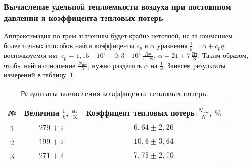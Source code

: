 \documentclass[a4paper,11pt]{article}
\begin{document}
\subsubsection{Вычисление удельной теплоемкости воздуха при постоянном давлении и коэффицента тепловых потерь}
Аппроксимация по трем значениям будет крайне неточной, но за неимением более точных способов найти коэффиценты $c_{p}$ и $\alpha$ уравнения $\frac{1}{k} = \alpha + c_{p}q$, воспользуемся им.\newline
$c_{p} = 1,15\ \cdot\ 10^{4} \pm 0,3\ \cdot\ 10^{4}\ \frac{Дж}{г\ \cdot\ К}$.\newline\newline
$\alpha = 21 \pm 7\ \frac{Вт}{К}$.\newline\newline
Таким образом, чтобы найти отношение $\frac{N_{пот}}{N}$, нужно разделить $\alpha$ на $\frac{1}{k}$. Занесем результаты измерений в таблицу~\ref{table:tab8}.
\begin{table}[h!]
\centering
\begin{tabular}{ ||c|c|c|| }
  \hline
  № & Величина $\frac{1}{k}$, $\frac{Вт}{К}$ & Коэффицент тепловых потерь $\frac{N_{пот}}{N}$, $\%$ \\
  \hline
  1 & $279 \pm 2$ & $6,64 \pm 2,26$ \\
  2 & $199 \pm 2$ & $10,6 \pm 3,64$ \\
  3 & $271 \pm 4$ & $7,75 \pm 2,70$ \\
  \hline
\end{tabular}
\caption{Результаты вычисления коэффицента тепловых потерь.}
\label{table:tab8}
\end{table}
\end{document}
